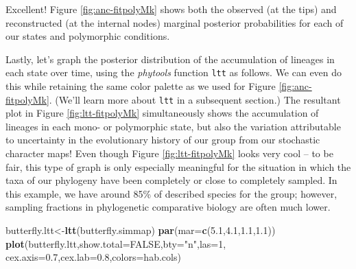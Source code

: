 \documentclass[fleqn,10pt,lineno]{wlpeerj} %
\newenvironment{Shaded}{\begin{snugshade}}{\end{snugshade}}
\newcommand{\AttributeTok}[1]{\textcolor[rgb]{0.13,0.29,0.53}{#1}}
\newcommand{\ConstantTok}[1]{\textcolor[rgb]{0.56,0.35,0.01}{#1}}
\newcommand{\DecValTok}[1]{\textcolor[rgb]{0.00,0.00,0.81}{#1}}
\newcommand{\FloatTok}[1]{\textcolor[rgb]{0.00,0.00,0.81}{#1}}
\newcommand{\FunctionTok}[1]{\textcolor[rgb]{0.13,0.29,0.53}{\textbf{#1}}}
\newcommand{\NormalTok}[1]{#1}
\newcommand{\OtherTok}[1]{\textcolor[rgb]{0.56,0.35,0.01}{#1}}
\newcommand{\StringTok}[1]{\textcolor[rgb]{0.31,0.60,0.02}{#1}}
\begin{document}
Excellent! Figure \ref{fig:anc-fitpolyMk} shows both the observed (at the tips) and reconstructed (at the internal nodes) marginal posterior probabilities for each of our states and polymorphic conditions.

Lastly, let's graph the posterior distribution of the accumulation of lineages in each state over time, using the \emph{phytools} function \texttt{ltt} as follows. We can even do this while retaining the same color palette as we used for Figure \ref{fig:anc-fitpolyMk}. (We'll learn more about \texttt{ltt} in a subsequent section.) The resultant plot in Figure \ref{fig:ltt-fitpolyMk} simultaneously shows the accumulation of lineages in each mono- or polymorphic state, but also the variation attributable to uncertainty in the evolutionary history of our group from our stochastic character maps! Even though Figure \ref{fig:ltt-fitpolyMk} looks very cool -- to be fair, this type of graph is only especially meaningful for the situation in which the taxa of our phylogeny have been completely or close to completely sampled. In this example, we have around 85\% of described species for the group; however, sampling fractions in phylogenetic comparative biology are often much lower.

\begin{Shaded}
\begin{Highlighting}[]
\NormalTok{butterfly.ltt}\OtherTok{\textless{}{-}}\FunctionTok{ltt}\NormalTok{(butterfly.simmap)}
\FunctionTok{par}\NormalTok{(}\AttributeTok{mar=}\FunctionTok{c}\NormalTok{(}\FloatTok{5.1}\NormalTok{,}\FloatTok{4.1}\NormalTok{,}\FloatTok{1.1}\NormalTok{,}\FloatTok{1.1}\NormalTok{))}
\FunctionTok{plot}\NormalTok{(butterfly.ltt,}\AttributeTok{show.total=}\ConstantTok{FALSE}\NormalTok{,}\AttributeTok{bty=}\StringTok{"n"}\NormalTok{,}\AttributeTok{las=}\DecValTok{1}\NormalTok{,}
  \AttributeTok{cex.axis=}\FloatTok{0.7}\NormalTok{,}\AttributeTok{cex.lab=}\FloatTok{0.8}\NormalTok{,}\AttributeTok{colors=}\NormalTok{hab.cols)}
\end{Highlighting}
\end{Shaded}
\end{document}
